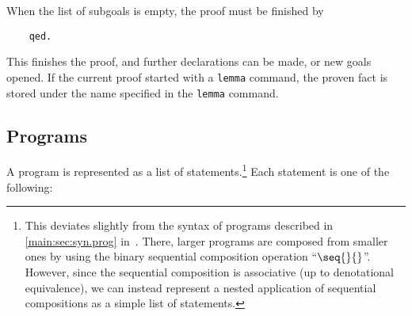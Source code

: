 \documentclass{article}
\newcommand\qrhlautoref[1]{\autoref*{main:#1} in~\cite{qrhl-paper-from-manual}}
\begin{document}
When the list of subgoals is empty, the proof must be finished by
\begin{center}
  \begin{lstlisting}
    qed.
  \end{lstlisting}
\end{center}
This finishes the proof, and further declarations can be made, or new
goals opened. If the current proof started with a \texttt{lemma}
command, the proven fact is stored under the name specified in the
\texttt{lemma} command.


\subsection{Programs}
\label{sec:tool.programs}

A program is represented as a list of statements.\footnote{This
  deviates slightly from the syntax of programs described in
  \qrhlautoref{sec:syn.prog}. There, larger programs are composed from
  smaller ones by using the binary sequential composition operation
  ``$\seq{}{}$''.
  However, since the sequential composition is associative (up to
  denotational equivalence), we can instead represent a nested
  application of sequential compositions as a simple list of
  statements.} Each statement is one of the following:

\newcommand\toolprog[1]{\index{#1@\textttOLD{#1} (tool program syntax)}}
\end{document}
